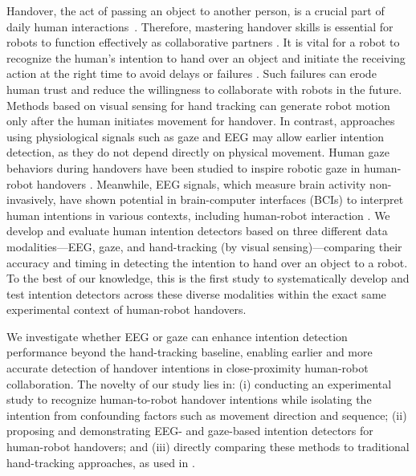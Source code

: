 Handover, the act of passing an object to another person, is a crucial part of daily human interactions~\cite{survey_review_2022_object_handovers,When_where_how_human-human_studyStrabala}. Therefore, mastering handover skills is essential for robots to function effectively as collaborative partners \cite{survey_review_2022_object_handovers,data_driven_grip_release}. It is vital for a robot to recognize the human's intention to hand over an object and initiate the receiving action at the right time to avoid delays or failures \cite{intention_multimodal_Wang2022,nonaEEG}. Such failures can erode human trust and reduce the willingness to collaborate with robots in the future. Methods based on visual sensing for hand tracking can generate robot motion only after the human initiates movement for handover.
In contrast, approaches using physiological signals such as gaze and EEG may allow earlier intention detection, as they do not depend directly on physical movement. Human gaze behaviors during handovers have been studied to inspire robotic gaze in human-robot handovers \cite{shared_attention_gaze_hanover_timing_2014}. Meanwhile, EEG signals, which measure brain activity non-invasively, have shown potential in brain-computer interfaces (BCIs) to interpret human intentions in various contexts, including human-robot interaction \cite{varbu2022past}.
We develop and evaluate human intention detectors based on three different data modalities—EEG, gaze, and hand-tracking (by visual sensing)—comparing their accuracy and timing in detecting the intention to hand over an object to a robot. To the best of our knowledge, this is the first study to systematically develop and test intention detectors across these diverse modalities within the exact same experimental context of human-robot handovers. 

We investigate whether EEG or gaze can enhance intention detection performance beyond the hand-tracking baseline, enabling earlier and more accurate detection of handover intentions in close-proximity human-robot collaboration. The novelty of our study lies in: (i) conducting an experimental study to recognize human-to-robot handover intentions while isolating the intention from confounding factors such as movement direction and sequence; (ii) proposing and demonstrating EEG- and gaze-based intention detectors for human-robot handovers; and (iii) directly comparing these methods to traditional hand-tracking approaches, as used in \cite{contrast_handover_poses_for_intent_handover_cakmak2011,survey_review_2022_object_handovers}.

